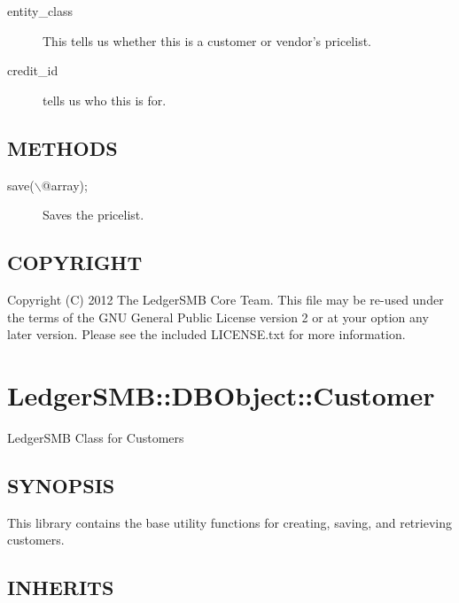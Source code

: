 \begin{description}
\begin{description}
\begin{description}
\begin{description}
\begin{description}
\begin{description}
\begin{description}
\begin{description}
\begin{description}
\begin{description}
\begin{description}
\item[{entity\_class}] \mbox{}

This tells us whether this is a customer or vendor's pricelist.


\item[{credit\_id}] \mbox{}

tells us who this is for.

\end{description}
\subsection*{METHODS\label{LedgerSMB::DBObject::Pricelist_METHODS}}
\begin{description}

\item[{save($\backslash$@array);}] \mbox{}

Saves the pricelist.

\end{description}
\subsection*{COPYRIGHT\label{LedgerSMB::DBObject::Pricelist_COPYRIGHT}}


Copyright (C) 2012 The LedgerSMB Core Team.  This file may be re-used under the
terms of the GNU General Public License version 2 or at your option any later
version.  Please see the included LICENSE.txt for more information.

\section{LedgerSMB::DBObject::Customer\label{LedgerSMB::DBObject::Customer}}


LedgerSMB Class for Customers

\subsection*{SYNOPSIS\label{LedgerSMB::DBObject::Customer_SYNOPSIS}}


This library contains the base utility functions for creating, saving, and
retrieving customers.

\subsection*{INHERITS\label{LedgerSMB::DBObject::Customer_INHERITS}}



\end{description}
\end{description}
\end{description}
\end{description}
\end{description}
\end{description}
\end{description}
\end{description}
\end{description}
\end{description}
